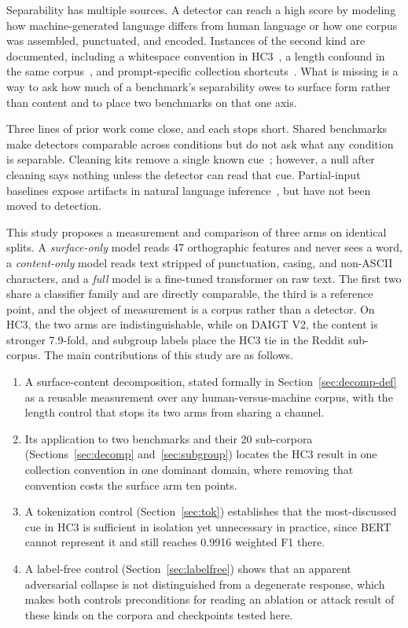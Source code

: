 \documentclass[conference,a4paper]{IEEEtran}
\newcommand{\secref}[1]{\hyperref[#1]{\ref*{#1}}}
\begin{document}
Separability has multiple sources. A detector can reach a high score by modeling how machine-generated language differs from human language or how one corpus was assembled, punctuated, and encoded. Instances of the second kind are documented, including a whitespace convention in HC3~\cite{Tian2023multiscale}, a length confound in the same corpus~\cite{Baidya2026detecting}, and prompt-specific collection shortcuts~\cite{Park2024investigating}. What is missing is a way to ask how much of a benchmark's separability owes to surface form rather than content and to place two benchmarks on that one axis.

Three lines of prior work come close, and each stops short. Shared benchmarks~\cite{Dugan2024raid,Wang2024m4} make detectors comparable across conditions but do not ask what any condition is separable. Cleaning kits remove a single known cue~\cite{Tian2023multiscale}; however, a null after cleaning says nothing unless the detector can read that cue. Partial-input baselines expose artifacts in natural language inference~\cite{Gururangan2018annotation,Poliak2018hypothesis}, but have not been moved to detection.

This study proposes a measurement and comparison of three arms on identical splits. A \emph{surface-only} model reads 47 orthographic features and never sees a word, a \emph{content-only} model reads text stripped of punctuation, casing, and non-ASCII characters, and a \emph{full} model is a fine-tuned transformer on raw text. The first two share a classifier family and are directly comparable, the third is a reference point, and the object of measurement is a corpus rather than a detector. On HC3, the two arms are indistinguishable, while on DAIGT V2, the content is stronger 7.9-fold, and subgroup labels place the HC3 tie in the Reddit sub-corpus. The main contributions of this study are as follows.
\begin{enumerate}
\item A surface-content decomposition, stated formally in Section~\secref{sec:decomp-def} as a reusable measurement over any human-versus-machine corpus, with the length control that stops its two arms from sharing a channel.
\item Its application to two benchmarks and their 20 sub-corpora (Sections~\secref{sec:decomp} and~\secref{sec:subgroup}) locates the HC3 result in one collection convention in one dominant domain, where removing that convention costs the surface arm ten points.
\item A tokenization control (Section~\secref{sec:tok}) establishes that the most-discussed cue in HC3 is sufficient in isolation yet unnecessary in practice, since BERT cannot represent it and still reaches 0.9916 weighted F1 there.
\item A label-free control (Section~\secref{sec:labelfree}) shows that an apparent adversarial collapse is not distinguished from a degenerate response, which makes both controls preconditions for reading an ablation or attack result of these kinds on the corpora and checkpoints tested here.
\end{enumerate}
\end{document}

